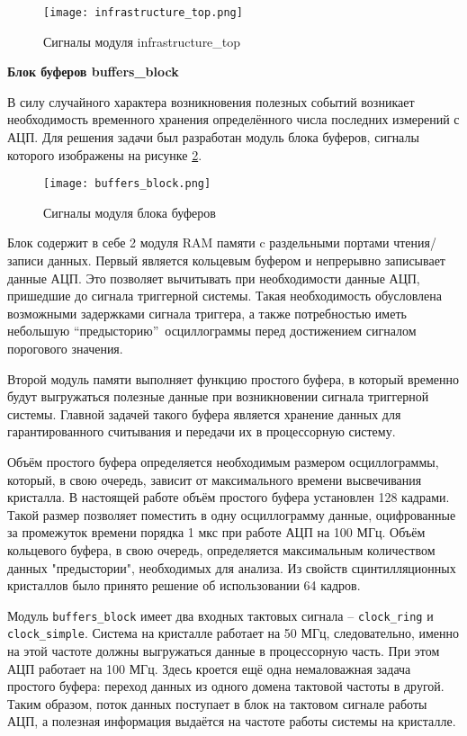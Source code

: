 \begin{figure}[ht]
    \centering
    \texttt{[image: infrastructure\_top.png]}
    \caption{Сигналы модуля infrastructure\_top}
    \label{fig:infrastructure_top}
\end{figure}
\textbf{Блок буферов buffers\_block}\par
В силу случайного характера возникновения полезных событий возникает необходимость временного хранения определённого числа последних измерений с АЦП. Для решения задачи был разработан модуль блока буферов, сигналы которого изображены на рисунке \ref{fig:buffers_block}.\par
\begin{figure}[ht]
    \centering
    \texttt{[image: buffers\_block.png]}
    \caption{Сигналы модуля блока буферов}
    \label{fig:buffers_block}
\end{figure}
Блок содержит в себе 2 модуля RAM памяти c раздельными портами чтения/записи данных. Первый является кольцевым буфером и непрерывно записывает данные АЦП. Это позволяет вычитывать при необходимости данные АЦП, пришедшие до сигнала триггерной системы. Такая необходимость обусловлена возможными задержками сигнала триггера, а также потребностью иметь небольшую ``предысторию''~осциллограммы перед достижением сигналом порогового значения.\par
Второй модуль памяти выполняет функцию простого буфера, в который временно будут выгружаться полезные данные при возникновении сигнала триггерной системы. Главной задачей такого буфера является хранение данных для гарантированного считывания и передачи их в процессорную систему.\par
Объём простого буфера определяется необходимым размером осциллограммы, который, в свою очередь, зависит от максимального времени высвечивания кристалла. В настоящей работе объём простого буфера установлен 128 кадрами. Такой размер позволяет поместить в одну осциллограмму данные, оцифрованные за промежуток времени порядка 1 мкс при работе АЦП на 100 МГц. Объём кольцевого буфера, в свою очередь, определяется максимальным количеством данных "предыстории", необходимых для анализа. Из свойств сцинтилляционных кристаллов было принято решение об использовании 64 кадров.\par
Модуль \texttt{buffers\_block} имеет два входных тактовых сигнала -- \texttt{clock\_ring} и \texttt{clock\_simple}. Система на кристалле работает на 50 МГц, следовательно, именно на этой частоте должны выгружаться данные в процессорную часть. При этом АЦП работает на 100 МГц. Здесь кроется ещё одна немаловажная задача простого буфера: переход данных из одного домена тактовой частоты в другой. Таким образом, поток данных поступает в блок на тактовом сигнале работы АЦП, а полезная информация выдаётся на частоте работы системы на кристалле.\par
